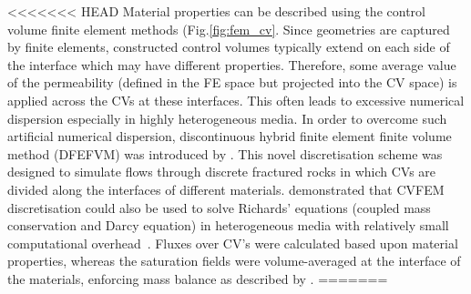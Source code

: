 \documentclass[preprint,authoryear,12pt]{elsarticle}
\begin{document}

<<<<<<< HEAD
\medskip
Material properties can be described using the control volume finite element methods (Fig.\ref{fig:fem_cv}. %
Since geometries are captured by finite elements, constructed control volumes typically extend on each side of the interface which may have different properties. Therefore, some average value of the permeability (defined in the FE space but projected into the CV space) is applied across the CVs at these interfaces. This often leads to excessive numerical dispersion especially in highly heterogeneous media. In order to overcome such artificial numerical dispersion, discontinuous hybrid finite element finite volume method (DFEFVM) was introduced by \citet{nick_2011b, nick_2011a}. This novel discretisation scheme was designed to simulate flows through discrete fractured rocks in which CVs are divided along the interfaces of different materials. \citet{cumming_2011} demonstrated that CVFEM discretisation could also be used to solve Richards' equations (coupled mass conservation and Darcy equation) in heterogeneous media with relatively small computational overhead~\citep[compared with traditional coupled velocity-pressure based formulations, see also][]{cumming_phd2012}. Fluxes over CV's were calculated based upon material properties, whereas the saturation fields were volume-averaged at the interface of the materials, enforcing mass balance as described by \citet{kirkland_1992}.
=======
\end{document}

